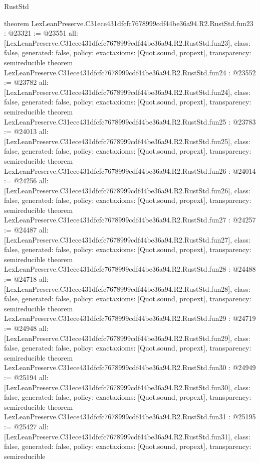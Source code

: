 \begin{lexlean}{RustStd}
\begin{coremodule}
{}
theorem LexLeanPreserve.C31ece431dfcfc7678999cdf44be36a94.R2.RustStd.fun23 : @23321 := @23551 {
  all: [LexLeanPreserve.C31ece431dfcfc7678999cdf44be36a94.R2.RustStd.fun23],
  class: false,
  generated: false,
  policy: exact{axioms: [Quot.sound, propext]},
  transparency: semireducible
}
theorem LexLeanPreserve.C31ece431dfcfc7678999cdf44be36a94.R2.RustStd.fun24 : @23552 := @23782 {
  all: [LexLeanPreserve.C31ece431dfcfc7678999cdf44be36a94.R2.RustStd.fun24],
  class: false,
  generated: false,
  policy: exact{axioms: [Quot.sound, propext]},
  transparency: semireducible
}
theorem LexLeanPreserve.C31ece431dfcfc7678999cdf44be36a94.R2.RustStd.fun25 : @23783 := @24013 {
  all: [LexLeanPreserve.C31ece431dfcfc7678999cdf44be36a94.R2.RustStd.fun25],
  class: false,
  generated: false,
  policy: exact{axioms: [Quot.sound, propext]},
  transparency: semireducible
}
theorem LexLeanPreserve.C31ece431dfcfc7678999cdf44be36a94.R2.RustStd.fun26 : @24014 := @24256 {
  all: [LexLeanPreserve.C31ece431dfcfc7678999cdf44be36a94.R2.RustStd.fun26],
  class: false,
  generated: false,
  policy: exact{axioms: [Quot.sound, propext]},
  transparency: semireducible
}
theorem LexLeanPreserve.C31ece431dfcfc7678999cdf44be36a94.R2.RustStd.fun27 : @24257 := @24487 {
  all: [LexLeanPreserve.C31ece431dfcfc7678999cdf44be36a94.R2.RustStd.fun27],
  class: false,
  generated: false,
  policy: exact{axioms: [Quot.sound, propext]},
  transparency: semireducible
}
theorem LexLeanPreserve.C31ece431dfcfc7678999cdf44be36a94.R2.RustStd.fun28 : @24488 := @24718 {
  all: [LexLeanPreserve.C31ece431dfcfc7678999cdf44be36a94.R2.RustStd.fun28],
  class: false,
  generated: false,
  policy: exact{axioms: [Quot.sound, propext]},
  transparency: semireducible
}
theorem LexLeanPreserve.C31ece431dfcfc7678999cdf44be36a94.R2.RustStd.fun29 : @24719 := @24948 {
  all: [LexLeanPreserve.C31ece431dfcfc7678999cdf44be36a94.R2.RustStd.fun29],
  class: false,
  generated: false,
  policy: exact{axioms: [Quot.sound, propext]},
  transparency: semireducible
}
theorem LexLeanPreserve.C31ece431dfcfc7678999cdf44be36a94.R2.RustStd.fun30 : @24949 := @25194 {
  all: [LexLeanPreserve.C31ece431dfcfc7678999cdf44be36a94.R2.RustStd.fun30],
  class: false,
  generated: false,
  policy: exact{axioms: [Quot.sound, propext]},
  transparency: semireducible
}
theorem LexLeanPreserve.C31ece431dfcfc7678999cdf44be36a94.R2.RustStd.fun31 : @25195 := @25427 {
  all: [LexLeanPreserve.C31ece431dfcfc7678999cdf44be36a94.R2.RustStd.fun31],
  class: false,
  generated: false,
  policy: exact{axioms: [Quot.sound, propext]},
  transparency: semireducible
}
\end{coremodule}
\end{lexlean}
